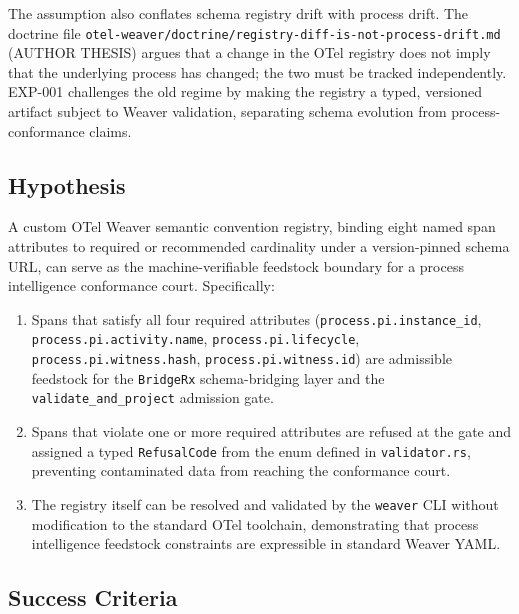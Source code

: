 The assumption also conflates schema registry drift with process drift.
The doctrine file \texttt{otel-weaver/doctrine/registry-diff-is-not-process-drift.md} (AUTHOR THESIS)
argues that a change in the OTel registry does not imply that the underlying process has changed;
the two must be tracked independently. EXP-001 challenges the old regime by making the registry
a typed, versioned artifact subject to Weaver validation, separating schema evolution from
process-conformance claims.

\subsection{Hypothesis}
\label{sec:otel-weaver-exp-001-custom-pi-registry-question-hypothesis}

A custom OTel Weaver semantic convention registry, binding eight named span attributes to required
or recommended cardinality under a version-pinned schema URL, can serve as the machine-verifiable
feedstock boundary for a process intelligence conformance court. Specifically:
\begin{enumerate}
  \item Spans that satisfy all four required attributes
        (\texttt{process.pi.instance\_id}, \texttt{process.pi.activity.name},
        \texttt{process.pi.lifecycle}, \texttt{process.pi.witness.hash},
        \texttt{process.pi.witness.id}) are admissible feedstock for the \texttt{BridgeRx}
        schema-bridging layer and the \texttt{validate\_and\_project} admission gate.
  \item Spans that violate one or more required attributes are refused at the gate and assigned
        a typed \texttt{RefusalCode} from the enum defined in \texttt{validator.rs}, preventing
        contaminated data from reaching the conformance court.
  \item The registry itself can be resolved and validated by the \texttt{weaver} CLI without
        modification to the standard OTel toolchain, demonstrating that process intelligence
        feedstock constraints are expressible in standard Weaver YAML.
\end{enumerate}

\subsection{Success Criteria}
\label{sec:otel-weaver-exp-001-custom-pi-registry-question-success}

